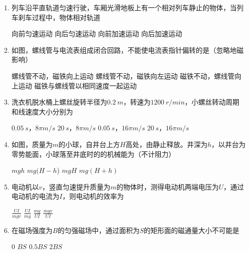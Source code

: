\begin{enumerate}
\item 
列车沿平直轨道匀速行驶，车厢光滑地板上有一个相对列车静止的物体，当列车刹车过程中，物体相对轨道  

\fourchoices
{向前匀速运动}
{向后匀速运动}
{向前加速运动}
{向后加速运动}



\item 
如图，螺线管与电流表组成闭合回路，不能使电流表指针偏转的是（忽略地磁影响）  
\begin{figure}[h!]
	\centering
	
\end{figure}

\fourchoices
{螺线管不动，磁铁向上运动}
{螺线管不动，磁铁向左运动}
{磁铁不动，螺线管向上运动}
{磁铁与螺线管以相同速度一起运动}





\item
洗衣机脱水桶上螺丝旋转半径为$ 0.2 \ m $，转速为$ 1200 \ r/min $，小螺丝转动周期和线速度大小分别为  

\fourchoices
{$ 0.05 \ s $，$ 8 \pi m/s $}
{$ 20 \ s $，$ 8 \pi m/s $}
{$ 0.05 \ s $，$ 16 \pi m/s $}
{$ 20 \ s $，$ 16 \pi m/s $}



\item
如图，质量为$ m $的小球，自井台上方$ H $高处，由静止释放。井深为$ h $，以井台为零势能面，小球落至井底时的的机械能为（不计阻力）  
\begin{figure}[h!]
	\centering
	
\end{figure}

\fourchoices
{$ mgh $}
{$ mg ( H-h $) }
{$ mgH $}
{$ mg ( H+h) $}




\item
电动机以$ v $，竖直匀速提升质量为$ m $的物体时，测得电动机两端电压为$ U $，通过电动机的电流为$ I $，则电动机的效率为  


\fourchoices
{$\frac{U I}{m g v}$}
{$\frac{U I}{m g}$}
{$\frac{m g}{U I}$}
{$\frac{m g v}{U I}$}




\item
在磁场强度为$ B $的匀强磁场中，通过面积为$ S $的矩形面的磁通量大小不可能是  

\fourchoices
{$ 0 $}
{$ BS $}
{$ 0.5BS $}
{$ 2BS $}






\end{enumerate}
